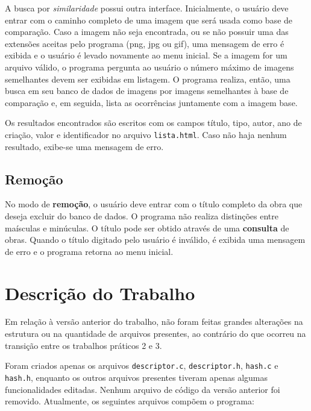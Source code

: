 \documentclass[a4paper,10pt]{article}
\begin{document}
A busca por \textit{similaridade} possui outra interface. Inicialmente, o usuário deve entrar com o caminho completo de uma imagem que será usada como base de comparação. Caso a imagem não seja encontrada, ou se não possuir uma das extensões aceitas pelo programa (png, jpg ou gif), uma mensagem de erro é exibida e o usuário é levado novamente ao menu inicial. Se a imagem for um arquivo válido, o programa pergunta ao usuário o número máximo de imagens semelhantes devem ser exibidas em listagem. O programa realiza, então, uma busca em seu banco de dados de imagens por imagens semelhantes à base de comparação e, em seguida, lista as ocorrências juntamente com a imagem base.

Os resultados encontrados são escritos com os campos título, tipo, autor, ano de criação, valor e identificador no arquivo \texttt{lista.html}. Caso não haja nenhum resultado, exibe-se uma mensagem de erro.

\subsection{Remoção}
No modo de \textbf{remoção}, o usuário deve entrar com o título completo da obra que deseja excluir do banco de dados. O programa não realiza distinções entre maísculas e minúculas. O título pode ser obtido através de uma \textbf{consulta} de obras. Quando o título digitado pelo usuário é inválido, é exibida uma mensagem de erro e o programa retorna ao menu inicial.

\section{Descrição do Trabalho}
Em relação à versão anterior do trabalho, não foram feitas grandes alterações na estrutura ou na quantidade de arquivos presentes, ao contrário do que ocorreu na transição entre os trabalhos práticos 2 e 3.

Foram criados apenas os arquivos \texttt{descriptor.c}, \texttt{descriptor.h}, \texttt{hash.c} e \texttt{hash.h}, enquanto os outros arquivos presentes tiveram apenas algumas funcionalidades editadas. Nenhum arquivo de código da versão anterior foi removido. Atualmente, os seguintes arquivos compõem o programa:
\end{document}
